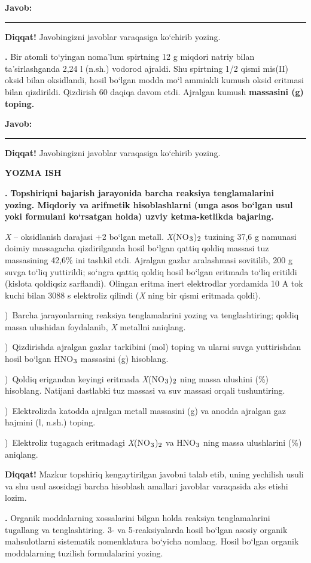 \documentclass[11pt,a4paper]{article}
\renewcommand{\textsubscript}[1]{\ensuremath{_{\text{\fontsize{8}{8}\selectfont #1}}}}
\newcommand{\qn}[1]{\textbf{\fontsize{11.5}{13}\selectfont #1}}
\newcommand{\qsep}{\par\vspace{13pt}}
\newcommand{\diqqat}[1]{\par\smallskip\noindent\textbf{Diqqat!} #1\par\medskip}
\newcommand{\javob}{\par\nopagebreak[4]\smallskip\noindent\textbf{Javob:} \rule[-2pt]{7.5cm}{0.4pt}\par\smallskip\noindent\textbf{Diqqat!} Javobingizni javoblar varaqasiga ko`chirib yozing.\par\medskip}
\begin{document}
\javob\qsep
\noindent\qn{40.} Bir atomli to`yingan noma'lum spirtning 12 g miqdori natriy bilan ta'sirlashganda 2,24 l (n.sh.) vodorod ajraldi. Shu spirtning 1/2 qismi mis(II) oksid bilan oksidlandi, hosil bo`lgan modda mo`l ammiakli kumush oksid eritmasi bilan qizdirildi. Qizdirish 60 daqiqa davom etdi. Ajralgan kumush \textbf{massasini (g) toping.}
\javob\qsep
\par\bigskip\begin{center}\textbf{\fontsize{13}{15}\selectfont YOZMA ISH}\end{center}
\noindent\qn{41.} \textbf{Topshiriqni bajarish jarayonida barcha reaksiya tenglamalarini yozing. Miqdoriy va arifmetik hisoblashlarni (unga asos bo`lgan usul yoki formulani ko`rsatgan holda) uzviy ketma-ketlikda bajaring.}\par\smallskip
\textit{X} -- oksidlanish darajasi +2 bo`lgan metall. \textit{X}(NO\textsubscript{3})\textsubscript{2} tuzining 37,6 g namunasi doimiy massagacha qizdirilganda hosil bo`lgan qattiq qoldiq massasi tuz massasining 42,6\% ini tashkil etdi. Ajralgan gazlar aralashmasi sovitilib, 200 g suvga to`liq yuttirildi; so`ngra qattiq qoldiq hosil bo`lgan eritmada to`liq eritildi (kislota qoldiqsiz sarflandi). Olingan eritma inert elektrodlar yordamida 10 A tok kuchi bilan 3088 s elektroliz qilindi (\textit{X} ning bir qismi eritmada qoldi).\par
{})\ Barcha jarayonlarning reaksiya tenglamalarini yozing va tenglashtiring; qoldiq massa ulushidan foydalanib, \textit{X} metallni aniqlang.\par
{})\ Qizdirishda ajralgan gazlar tarkibini (mol) toping va ularni suvga yuttirishdan hosil bo`lgan HNO\textsubscript{3} massasini (g) hisoblang.\par
{})\ Qoldiq erigandan keyingi eritmada \textit{X}(NO\textsubscript{3})\textsubscript{2} ning massa ulushini (\%) hisoblang. Natijani dastlabki tuz massasi va suv massasi orqali tushuntiring.\par
{})\ Elektrolizda katodda ajralgan metall massasini (g) va anodda ajralgan gaz hajmini (l, n.sh.) toping.\par
{})\ Elektroliz tugagach eritmadagi \textit{X}(NO\textsubscript{3})\textsubscript{2} va HNO\textsubscript{3} ning massa ulushlarini (\%) aniqlang.\par
\diqqat{Mazkur topshiriq kengaytirilgan javobni talab etib, uning yechilish usuli va shu usul asosidagi barcha hisoblash amallari javoblar varaqasida aks etishi lozim.}\qsep
\noindent\qn{42.} Organik moddalarning xossalarini bilgan holda reaksiya tenglamalarini tugallang va tenglashtiring. 3- va 5-reaksiyalarda hosil bo`lgan asosiy organik mahsulotlarni sistematik nomenklatura bo`yicha nomlang. Hosil bo`lgan organik moddalarning tuzilish formulalarini yozing.\par
\end{document}
